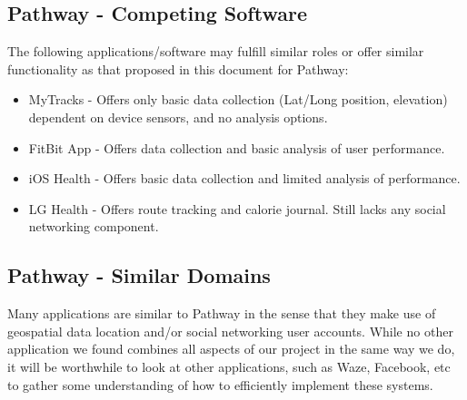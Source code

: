 ﻿\documentclass{article}
\begin{document}
\subsection{Pathway - Competing Software}
The following applications/software may fulfill similar roles or offer similar functionality as that proposed in this document for Pathway:
\begin{itemize}
    \item MyTracks - Offers only basic data collection (Lat/Long position, elevation) dependent on device sensors, and no analysis options.
    \item FitBit App - Offers data collection and basic analysis of user performance.
    \item iOS Health - Offers basic data collection and limited analysis of performance.
    \item LG Health - Offers route tracking and calorie journal. Still lacks any social networking component.
\end{itemize}

\subsection{Pathway - Similar Domains}
Many applications are similar to Pathway in the sense that they make use of geospatial data location and/or social networking user accounts. While no other application we found combines all aspects of our project in the same way we do, it will be worthwhile to look at other applications, such as Waze, Facebook, etc to gather some understanding of how to efficiently implement these systems.
\end{document}
